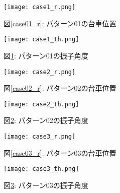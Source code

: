 \begin{figure}[htbp]
    \begin{minipage}{0.5\hsize}
        \begin{center}
            \texttt{[image: case1\_r.png]}
            \caption{図\ref{case01_r}: パターン01の台車位置}
            \label{case01_r}
        \end{center}
    \end{minipage}
    \begin{minipage}{0.5\hsize}
        \begin{center}
            \texttt{[image: case1\_th.png]}
            \caption{図\ref{case01_th}: パターン01の振子角度}
            \label{case01_th}
        \end{center}
    \end{minipage}
\end{figure}

\begin{figure}[htbp]
    \begin{minipage}{0.5\hsize}
        \begin{center}
            \texttt{[image: case2\_r.png]}
            \caption{図\ref{case02_r}: パターン02の台車位置}
            \label{case02_r}
        \end{center}
    \end{minipage}
    \begin{minipage}{0.5\hsize}
        \begin{center}
            \texttt{[image: case2\_th.png]}
            \caption{図\ref{case02_th}: パターン02の振子角度}
            \label{case02_th}
        \end{center}
    \end{minipage}
\end{figure}

\begin{figure}[htbp]
    \begin{minipage}{0.5\hsize}
        \begin{center}
            \texttt{[image: case3\_r.png]}
            \caption{図\ref{case03_r}: パターン03の台車位置}
            \label{case03_r}
        \end{center}
    \end{minipage}
    \begin{minipage}{0.5\hsize}
        \begin{center}
            \texttt{[image: case3\_th.png]}
            \caption{図\ref{case03_th}: パターン03の振子角度}
            \label{case03_th}
        \end{center}
    \end{minipage}
\end{figure}

